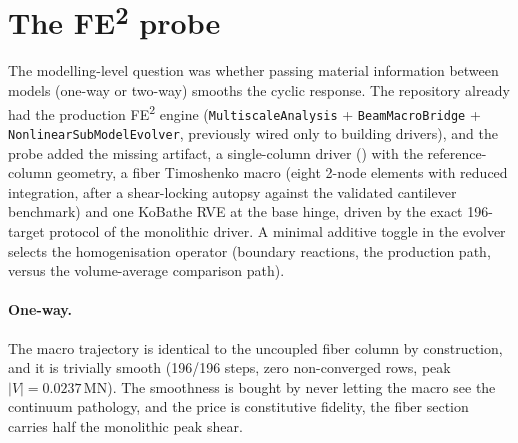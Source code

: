 \section{The FE\textsuperscript{2} probe}
\label{sec:fe2-probe}

The modelling-level question was whether passing material information
between models (one-way or two-way) smooths the cyclic response. The
repository already had the production FE\textsuperscript{2} engine
(\texttt{MultiscaleAnalysis} + \texttt{BeamMacroBridge} +
\texttt{NonlinearSubModelEvolver}, previously wired only to building
drivers), and the probe added the missing artifact, a single-column
driver () with the reference-column
geometry, a fiber Timoshenko macro (eight 2-node elements with reduced
integration, after a shear-locking autopsy against the validated
cantilever benchmark) and one KoBathe RVE at the base hinge, driven by
the exact 196-target protocol of the monolithic driver. A minimal
additive toggle in the evolver selects the homogenisation operator
(boundary reactions, the production path, versus the volume-average
comparison path).

\paragraph{One-way.} The macro trajectory is identical to the
uncoupled fiber column by construction, and it is trivially smooth
(196/196 steps, zero non-converged rows, peak $|V| = 0.0237$\,MN). The
smoothness is bought by never letting the macro see the continuum
pathology, and the price is constitutive fidelity, the fiber section
carries half the monolithic peak shear.

